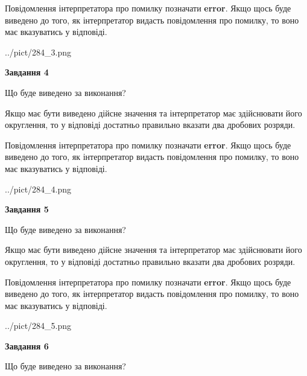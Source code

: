 \documentclass[12pt, ukrainian]{article}
\begin{document}
{\begin {Large}
Повідомлення інтерпретатора про помилку позначати \textbf{error}.
Якщо щось буде виведено до того, як інтерпретатор видасть повідомлення про помилку, 
то воно має вказуватись у відповіді. \par

\begin{center}
	{../pict/284_3.png}
\end{center}
\newpage

{\begin {center}\textbf{Завдання 4}\end {center}}\par
Що буде виведено за виконання? \par

Якщо має бути виведено дійсне значення та інтерпретатор має здійснювати його округлення, 
то у відповіді достатньо правильно вказати два дробових розряди.

Повідомлення інтерпретатора про помилку позначати \textbf{error}.
Якщо щось буде виведено до того, як інтерпретатор видасть повідомлення про помилку, 
то воно має вказуватись у відповіді. \par

\begin{center}
	{../pict/284_4.png}
\end{center}
\newpage

{\begin {center}\textbf{Завдання 5}\end {center}}\par
Що буде виведено за виконання? \par

Якщо має бути виведено дійсне значення та інтерпретатор має здійснювати його округлення, 
то у відповіді достатньо правильно вказати два дробових розряди.

Повідомлення інтерпретатора про помилку позначати \textbf{error}.
Якщо щось буде виведено до того, як інтерпретатор видасть повідомлення про помилку, 
то воно має вказуватись у відповіді. \par

\begin{center}
	{../pict/284_5.png}
\end{center}
\newpage

{\begin {center}\textbf{Завдання 6}\end {center}}\par
Що буде виведено за виконання? \par


\end{Large}}
\end{document}
